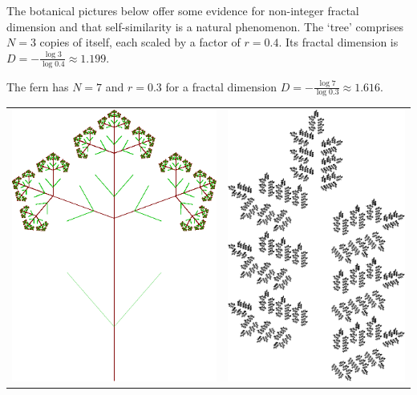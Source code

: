 \begin{example}{}{}
The botanical pictures below offer some evidence for non-integer fractal dimension and that self-similarity is a natural phenomenon. The `tree' comprises
 $N=3$ copies of itself, each scaled by a factor of $r=0.4$. Its fractal dimension is $D=-\frac{\log 3}{\log 0.4}\approx 1.199$.\par
The fern has $N=7$ and $r=0.3$ for a fractal dimension $D=-\frac{\log 7}{\log 0.3}\approx 1.616$.

\begin{center}
\begin{tabular}{c@{\qquad\qquad}c}
\includegraphics{tree2}
&
\href{http://www.math.uci.edu/~ndonalds/math161/fern-code.html}{\includegraphics{tree3}}

\end{tabular}
\end{center}
\end{example}
